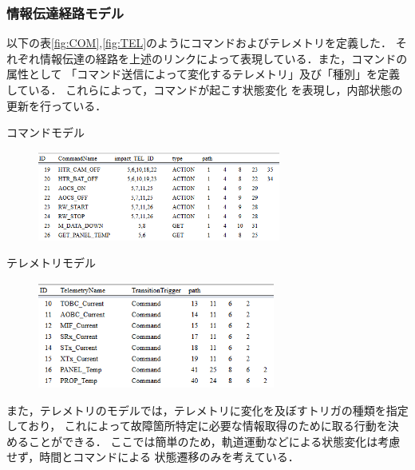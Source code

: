 \documentclass[11pt]{jsarticle}%
\begin{document}
\begin{multicols}{2}
\subsubsection{情報伝達経路モデル}
以下の表\ref{fig:COM},\ref{fig:TEL}のようにコマンドおよびテレメトリを定義した．
それぞれ情報伝達の経路を上述のリンクによって表現している．また，コマンドの属性として
「コマンド送信によって変化するテレメトリ」及び「種別」を定義している．
これらによって，コマンドが起こす状態変化
を表現し，内部状態の更新を行っている．%
\begin{table}[H]
  \centering
  \caption{コマンドモデル}
  \label{fig:COM}
\end{table}
\vspace{-3zh}
\begin{figure}[H]
  \centering
    \includegraphics[width=8cm]{../figure/COM_resume.png}
\end{figure}
\vspace{-2zh}
\begin{table}[H]
  \centering
  \caption{テレメトリモデル}
  \label{fig:TEL}
\end{table}
\vspace{-3zh}
\begin{figure}[H]
  \centering
    \includegraphics[height=3.5cm]{../figure/TEL_resume.png}
\end{figure}
\vspace{-1zh}
また，テレメトリのモデルでは，テレメトリに変化を及ぼすトリガの種類を指定しており，
これによって故障箇所特定に必要な情報取得のために取る行動を決めることができる．
ここでは簡単のため，軌道運動などによる状態変化は考慮せず，時間とコマンドによる
状態遷移のみを考えている．
\vspace{-1zh}

\end{multicols}
\end{document}
